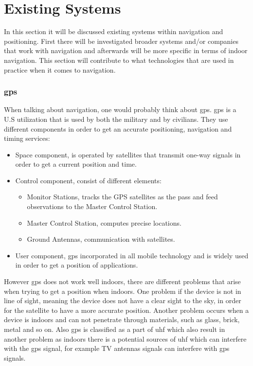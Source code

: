 \section{Existing Systems}
In this section it will be discussed existing systems within navigation and positioning. First there will be investigated broader systems and/or companies that work with navigation and afterwards will be more specific in terms of indoor navigation. This section will contribute to what technologies that are used in practice when it comes to navigation. 


\subsubsection{\gls{gps}}
When talking about navigation, one would probably think about \gls{gps}. \gls{gps} is a U.S utilization that is used by both the military and by civilians. They use different components in order to get an accurate positioning, navigation and timing services:\cite{GPSofficial}

\begin{itemize}
    \item Space component, is operated by satellites that transmit one-way signals in order to get a current position and time. 
    \item Control component, consist of different elements: 
    \begin{itemize}
        \item Monitor Stations, tracks the GPS satellites as the pass and feed observations to the Master Control Station. 
        \item Master Control Station, computes precise locations.
        \item Ground Antennas, communication with satellites. 
    \end{itemize}
    \item User component, \gls{gps} incorporated in all mobile technology and is widely used in order to get a position of applications.
\end{itemize}

However \gls{gps} does not work well indoors, there are different problems that arise when trying to get a position when indoors. One problem if the device is not in line of sight, meaning the device does not have a clear sight to the sky, in order for the satellite to have a more accurate position. Another problem occurs when a device is indoors and can not penetrate through materials, such as glass, brick, metal and so on. Also \gls{gps} is classified as a part of \gls{uhf} which also result in another problem as indoors there is a potential sources of \gls{uhf} which can interfere with the \gls{gps} signal, for example TV antennas signals can interfere with \gls{gps} signals. \cite{GPSofficial}

